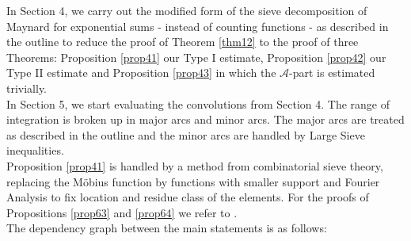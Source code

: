 \documentclass{amsart}
\numberwithin{equation}{subsection}
\begin{document}
In Section 4, we carry out the modified form of the sieve decomposition of Maynard \cite{maynard} for exponential sums - instead of counting functions - as described in the outline to reduce the proof of Theorem \ref{thm12} to the proof of three Theorems: Proposition \ref{prop41} our Type I estimate, Proposition \ref{prop42} our Type II estimate and Proposition \ref{prop43} in which the $\mathcal{A}$-part is estimated trivially.\\
In Section 5, we start evaluating the convolutions from Section 4. The range of integration is broken up in major arcs and minor arcs. The major arcs are treated as described in the outline and the minor arcs are handled by Large Sieve inequalities.\\
Proposition \ref{prop41} is handled by a method from combinatorial sieve theory, replacing the M\"obius function by functions with smaller support and Fourier Analysis to fix location and residue class of the elements. For the proofs of Propositions  \ref{prop63} and \ref{prop64} we refer to \cite{maier-rassias-gold}.\\
The dependency graph between the main statements is as follows:\\

\end{document}
